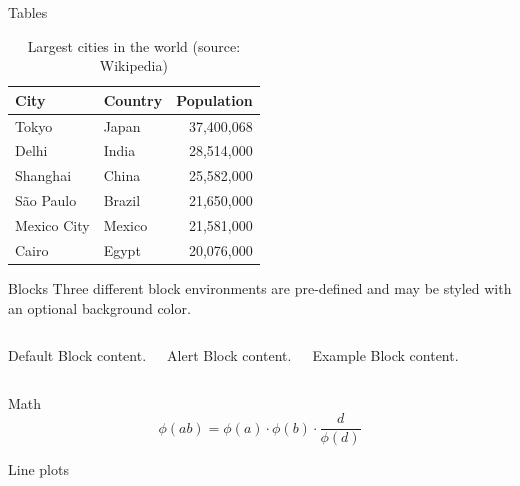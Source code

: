 \documentclass[aspectratio=169,usenames,dvipsnames,pdftex]{beamer}
\begin{document}
	\begin{frame}{Tables}
		\begin{table}
			\caption{Largest cities in the world (source: Wikipedia)}
			\begin{tabular}{@{} llr @{}}
				\toprule
				City & Country & Population\\
				\midrule
				Tokyo & Japan & 37,400,068\\
				Delhi & India & 28,514,000\\
				Shanghai & China & 25,582,000\\
				São Paulo & Brazil & 21,650,000\\
				Mexico City & Mexico & 	21,581,000\\
				Cairo & Egypt & 20,076,000\\
				\bottomrule
			\end{tabular}
		\end{table}
	\end{frame}

	\begin{frame}{Blocks}
		Three different block environments are pre-defined and may be styled with an
		optional background color.

		\begin{columns}[T,onlytextwidth]
				\begin{block}{Default}
					Block content.
				\end{block}

				\begin{alertblock}{Alert}
					Block content.
				\end{alertblock}

				\begin{exampleblock}{Example}
					Block content.
				\end{exampleblock}
		\end{columns}
	\end{frame}

	\begin{frame}{Math}
    \begin{equation*}
      \phi(ab) = \phi(a) \cdot \phi(b) \cdot \frac{d}{\phi(d)}
    \end{equation*}
	\end{frame}

	\begin{frame}{Line plots}
		\begin{figure}
		\end{figure}
	\end{frame}
\end{document}
